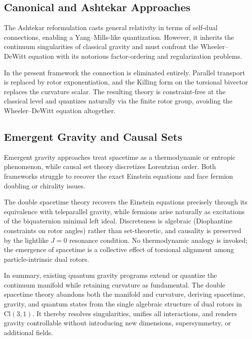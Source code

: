 \documentclass[dvipdfmx,11pt,a4paper]{article}
\begin{document}
\subsection{Canonical and Ashtekar Approaches}

The Ashtekar reformulation casts general relativity in terms of self-dual connections, enabling a Yang--Mills-like quantization. However, it inherits the continuum singularities of classical gravity and must confront the Wheeler--DeWitt equation with its notorious factor-ordering and regularization problems.

In the present framework the connection is eliminated entirely. Parallel transport is replaced by rotor exponentiation, and the Killing form on the torsional bivector replaces the curvature scalar. The resulting theory is constraint-free at the classical level and quantizes naturally via the finite rotor group, avoiding the Wheeler--DeWitt equation altogether.

\subsection{Emergent Gravity and Causal Sets}

Emergent gravity approaches treat spacetime as a thermodynamic or entropic phenomenon, while causal set theory discretizes Lorentzian order. Both frameworks struggle to recover the exact Einstein equations and face fermion doubling or chirality issues.

The double spacetime theory recovers the Einstein equations precisely through its equivalence with teleparallel gravity, while fermions arise naturally as excitations of the biquaternion minimal left ideal. Discreteness is algebraic (Diophantine constraints on rotor angles) rather than set-theoretic, and causality is preserved by the lightlike $J=0$ resonance condition. No thermodynamic analogy is invoked; the emergence of spacetime is a collective effect of torsional alignment among particle-intrinsic dual rotors.

In summary, existing quantum gravity programs extend or quantize the continuum manifold while retaining curvature as fundamental. The double spacetime theory abandons both the manifold and curvature, deriving spacetime, gravity, and quantum states from the single algebraic structure of dual rotors in $\mathrm{Cl}(3,1)$. It thereby resolves singularities, unifies all interactions, and renders gravity controllable without introducing new dimensions, supersymmetry, or additional fields.
\end{document}
